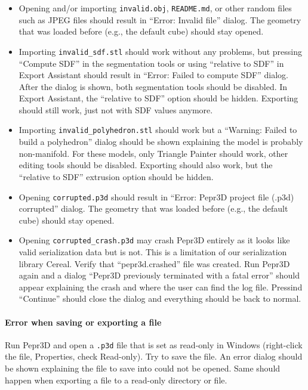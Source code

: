 \begin{itemize}
\item Opening and/or importing \texttt{invalid.obj}, \texttt{README.md}, or other random files such as JPEG files should result in ``Error: Invalid file'' dialog. The geometry that was loaded before (e.g., the default cube) should stay opened.
\item Importing \texttt{invalid\_sdf.stl} should work without any problems, but pressing ``Compute SDF'' in the segmentation tools or using ``relative to SDF'' in Export Assistant should result in ``Error: Failed to compute SDF'' dialog. After the dialog is shown, both segmentation tools should be disabled. In Export Assistant, the ``relative to SDF'' option should be hidden. Exporting should still work, just not with SDF values anymore.
\item Importing \texttt{invalid\_polyhedron.stl} should work but a ``Warning: Failed to build a polyhedron'' dialog should be shown explaining the model is probably non-manifold. For these models, only Triangle Painter should work, other editing tools should be disabled. Exporting should also work, but the ``relative to SDF'' extrusion option should be hidden.
\item Opening \texttt{corrupted.p3d} should result in ``Error: Pepr3D project file (.p3d) corrupted'' dialog. The geometry that was loaded before (e.g., the default cube) should stay opened.
\item Opening \texttt{corrupted\_crash.p3d} may crash Pepr3D entirely as it looks like valid serialization data but is not. This is a limitation of our serialization library Cereal. Verify that ``pepr3d.crashed'' file was created. Run Pepr3D again and a dialog ``Pepr3D previously terminated with a fatal error'' should appear explaining the crash and where the user can find the log file. Pressind ``Continue'' should close the dialog and everything should be back to normal.
\end{itemize}

\paragraph{Error when saving or exporting a file}
Run Pepr3D and open a \texttt{.p3d} file that is set as read-only in Windows (right-click the file, Properties, check Read-only).
Try to save the file.
An error dialog should be shown explaining the file to save into could not be opened.
Same should happen when exporting a file to a read-only directory or file.

